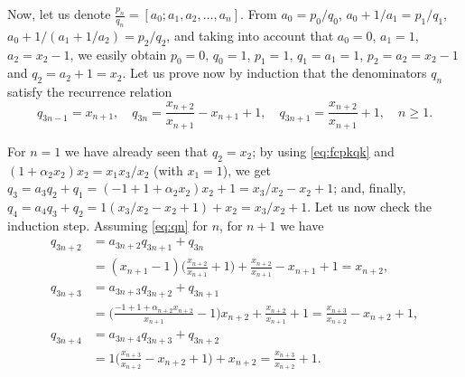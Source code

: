 \documentclass[11pt, a4paper]{amsart}
\newcommand{\Zp}{\mathbb{Z}^{+}}
\theoremstyle{plain}
\theoremstyle{remark}
\begin{document}
Now, let us denote $\frac{p_n}{q_n} = [a_0;a_1,a_2,\dots,a_n]$. 
From $a_0 = p_0/q_0$, $a_0+1/a_1 = p_1/q_1$, $a_0+1/(a_1+1/a_2) = p_2/q_2$, and taking into account that $a_0=0$, $a_1=1$, $a_2=x_2-1$, we easily obtain $p_0=0$, $q_0=1$, $p_1=1$, $q_1=a_1=1$, $p_2=a_2=x_2-1$ and $q_2=a_2+1=x_2$.
Let us prove now by induction that the denominators $q_n$ satisfy the recurrence relation
\begin{equation}
\label{eq:qn}
  q_{3n-1} = x_{n+1}, \quad
  q_{3n} = \frac{x_{n+2}}{x_{n+1}}-x_{n+1}+1, \quad
  q_{3n+1} = \frac{x_{n+2}}{x_{n+1}}+1, %
  \quad n \ge 1.
\end{equation}

For $n=1$ we have already seen that $q_2=x_2$; 
by using \eqref{eq:fcpkqk} and $(1+\alpha_2x_2)x_2 = x_1x_3/x_2$ (with $x_1=1$), we get
$q_3 = a_3q_2 + q_1 = (-1+1+\alpha_2x_2)x_2+1 = x_3/x_2-x_2+1$; 
and, finally, 
$q_4 = a_4q_3 + q_2 = 1(x_3/x_2-x_2+1)+x_2 = x_3/x_2+1$.
Let us now check the induction step.
Assuming \eqref{eq:qn} for $n$, for $n+1$ we have
\begin{align*}
q_{3n+2} &= a_{3n+2} q_{3n+1} + q_{3n} \\
&= (x_{n+1}-1) \Big( \frac{x_{n+2}}{x_{n+1}}+1 \Big)
+ \frac{x_{n+2}}{x_{n+1}}-x_{n+1}+1
= x_{n+2},\\
q_{3n+3} &= a_{3n+3} q_{3n+2} + q_{3n+1} \\
&= \Big( \frac{-1+1+\alpha_{n+2}x_{n+2}}{x_{n+1}} - 1 \Big) x_{n+2}
+ \frac{x_{n+2}}{x_{n+1}}+1
= \frac{x_{n+3}}{x_{n+2}}-x_{n+2}+1,\\
q_{3n+4} &= a_{3n+4} q_{3n+3} + q_{3n+2} \\
&= 1 \Big( \frac{x_{n+3}}{x_{n+2}} - x_{n+2} + 1 \Big) 
+ x_{n+2} = \frac{x_{n+3}}{x_{n+2}}+1.
\end{align*}
\end{document}
